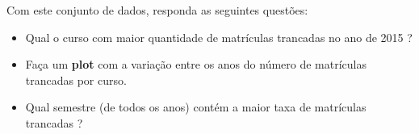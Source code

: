 \documentclass[12pt]{article}
\begin{document}
Com este conjunto de dados, responda as seguintes questões:

\begin{itemize}
    \item Qual o curso com maior quantidade de matrículas trancadas no ano de 2015 ?
    \item Faça um \textbf{plot} com a variação entre os anos do número de matrículas trancadas por curso.
    \item Qual semestre (de todos os anos) contém a maior taxa de matrículas trancadas ?
\end{itemize}




% 
% 
\end{document}
